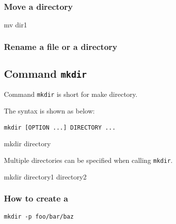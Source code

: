 \documentclass[]{book}
\makeatletter
\newenvironment{Shaded}{\begin{snugshade}}{\end{snugshade}}
\newcommand{\FunctionTok}[1]{\textcolor[rgb]{0.00,0.00,0.00}{#1}}
\newcommand{\NormalTok}[1]{#1}
\newenvironment{kframe}{%
\medskip{}
\setlength{\fboxsep}{.8em}
 \def\at@end@of@kframe{}%
 \ifinner\ifhmode%
  \def\at@end@of@kframe{\end{minipage}}%
  \begin{minipage}{\columnwidth}%
 \fi\fi%
 \def\FrameCommand##1{\hskip\@totalleftmargin \hskip-\fboxsep
 \colorbox{shadecolor}{##1}\hskip-\fboxsep
     \hskip-\linewidth \hskip-\@totalleftmargin \hskip\columnwidth}%
 \MakeFramed {\advance\hsize-\width
   \@totalleftmargin\z@ \linewidth\hsize
   \@setminipage}}%
 {\par\unskip\endMakeFramed%
 \at@end@of@kframe}
\renewenvironment{Shaded}{\begin{kframe}}{\end{kframe}}
\theoremstyle{definition}
\theoremstyle{definition}
\theoremstyle{definition}
\theoremstyle{remark}
\makeatother
\begin{document}
\subsubsection{Move a directory}\label{move-a-directory}

\begin{Shaded}
\begin{Highlighting}[]
\FunctionTok{mv}\NormalTok{ dir1}
\end{Highlighting}
\end{Shaded}

\subsubsection{Rename a file or a
directory}\label{rename-a-file-or-a-directory}

\subsection{\texorpdfstring{Command
\texttt{mkdir}}{Command mkdir}}\label{command-mkdir}

Command \texttt{mkdir} is short for make directory.

The syntax is shown as below:

\begin{verbatim}
mkdir [OPTION ...] DIRECTORY ...
\end{verbatim}

\begin{Shaded}
\begin{Highlighting}[]
\FunctionTok{mkdir}\NormalTok{ directory}
\end{Highlighting}
\end{Shaded}

Multiple directories can be specified when calling \texttt{mkdir}.

\begin{Shaded}
\begin{Highlighting}[]
\FunctionTok{mkdir}\NormalTok{ directory1 directory2}
\end{Highlighting}
\end{Shaded}

\subsubsection{How to create a}\label{how-to-create-a}

\begin{verbatim}
mkdir -p foo/bar/baz
\end{verbatim}
\end{document}
